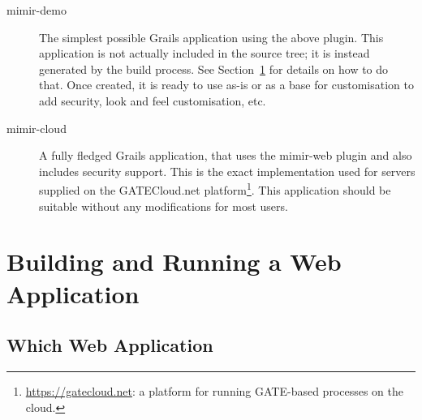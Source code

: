 \begin{description}
\item[mimir-demo] The simplest possible Grails application using the above
plugin. This application is not actually included in the source tree; it is
instead generated by the build process. See Section~\ref{sec:building} for
details on how to do that. Once created, it is ready to use as-is or as a base
for customisation to add security, look and feel customisation, etc.

\item[mimir-cloud] A fully fledged Grails application, that uses the mimir-web
plugin and also includes security support. This is the exact implementation used
for \Mimir{} servers supplied on the GATECloud.net
platform\footnote{\url{https://gatecloud.net}: a platform for running GATE-based
processes on the cloud.}. This application should be suitable without any
modifications for most users.
\end{description}

\section{Building and Running a \Mimir{} Web
Application}\label{sec:building}

\subsection{Which \Mimir{} Web Application}
\label{sec:webapps}


